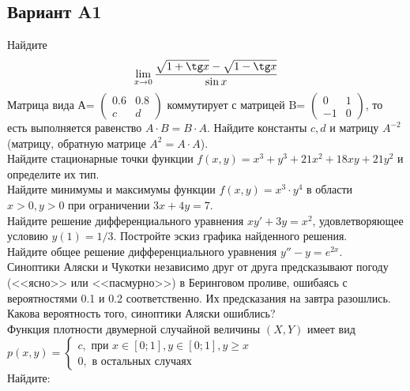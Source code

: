 \documentclass[addpoints, answers]{exam} %
\begin{document}
\subsection{Вариант A1}
\begin{questions}
\question Найдите 
\[
\lim_{x\to 0}\frac{\sqrt{1+\tg x}-\sqrt{1-\tg x}}{\sin x}
\]
\question Матрица вида А=
$\left( \begin{array}{cc}
0.6 & 0.8\\
c & d
\end{array} \right)$ 
коммутирует с матрицей B=
$\left( \begin{array}{cc}
0 & 1\\
-1 & 0
\end{array} \right)$, то есть выполняется равенство $A\cdot B=B\cdot A$. Найдите константы $c,d$ и матрицу $A^{-2}$ (матрицу, обратную матрице $A^2=A\cdot A$).\\

\question Найдите стационарные точки функции $f(x,y)=x^3+y^3+21x^2+18xy+21y^2$ и определите их тип.\\
\question Найдите минимумы и максимумы функции $f(x,y)=x^3\cdot y^4$ в области $x>0,y>0$ при ограничении $3x+4y=7$.\\
\question Найдите решение дифференциального уравнения $xy'+3y=x^2$, удовлетворяющее условию $y(1)=1/3$. Постройте эскиз графика найденного решения. \\
\question Найдите общее решение дифференциального уравнения $y''-y=e^{2x}$.\\
\question Синоптики Аляски и Чукотки независимо друг от друга предсказывают погоду (<<ясно>> или <<пасмурно>>) в Беринговом проливе, ошибаясь с вероятностями 0.1 и 0.2 соответственно. Их предсказания на завтра разошлись. Какова вероятность того, синоптики Аляски ошиблись?\\
\question Функция плотности двумерной случайной величины $(X,Y)$ имеет вид\\
$p(x,y)=\begin{cases}
c,\text{ при } x\in [0;1],y \in [0;1], y\geq x\\
0,\text{ в остальных случаях }
\end{cases}$\\
Найдите:
\end{questions}
\end{document}
